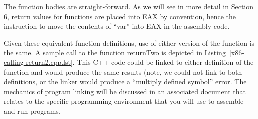 The function bodies are straight-forward. As we will see in more
detail in Section 6, return values for functions are placed into EAX
by convention, hence the instruction to move the contents of ``var''
into EAX in the assembly code.

\begin{figure}

\vspace{-0.25in}
\end{figure}

Given these equivalent function definitions, use of either version of
the function is the same.  A sample call to the function returnTwo is
depicted in Listing~\ref{x86-calling-return2.cpp.lst}. This C++ code
could be linked to either definition of the function and would produce
the same results (note, we could not link to both definitions, or the
linker would produce a ``multiply defined symbol'' error. The
mechanics of program linking will be discussed in an associated
document that relates to the specific programming environment that you
will use to assemble and run programs.
